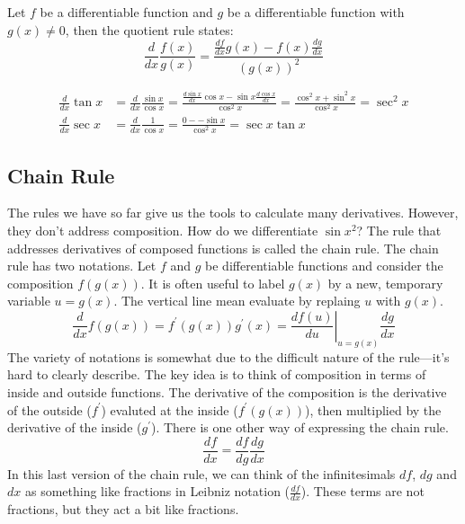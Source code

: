 \documentclass[fleqn]{report}
\begin{document}
Let $f$ be a differentiable function
and $g$ be a differentiable function with $g(x) \neq 0$, then
the quotient rule states:
\begin{equation*}
\frac{d}{dx} \frac{f(x)}{g(x)} = \frac{\frac{df}{dx} g(x) - f(x)
\frac{dg}{dx}}{(g(x))^2}
\end{equation*}

\begin{example}
\begin{align*}
\frac{d}{dx} \tan x & = \frac{d}{dx} \frac{\sin x}{\cos x} =
\frac{\frac{d \sin x}{dx} \cos x - \sin x \frac{d \cos
x}{dx}}{\cos^2 x} = \frac{\cos^2 x + \sin^2 x}{\cos^2 x} =
\sec^2 x \\
\frac{d}{dx} \sec x & = \frac{d}{dx} \frac{1}{\cos x} = \frac{0 -
- \sin x}{\cos^2 x} = \sec x \tan x 
\end{align*}
\end{example}

\subsection{Chain Rule}
\label{chain-rule}

The rules we have so far give us the tools to calculate many
derivatives. However, they don't address composition. 
How do we differentiate $\sin x^2$? The rule that
addresses derivatives of composed functions is called the chain
rule. The chain rule has two notations.  Let $f$ and $g$ be
differentiable functions and consider the composition
$f(g(x))$. It is often useful to label $g(x)$ by a new,
temporary variable $u = g(x)$. The vertical line mean evaluate
by replaing $u$ with $g(x)$.
\begin{equation*}
\frac{d}{dx} f(g(x)) = f^\prime(g(x)) g^\prime(x) = \left.
\frac{df(u)}{du} \right|_{u=g(x)} \frac{dg}{dx} 
\end{equation*}
The variety of notations is somewhat due to the difficult
nature of the rule---it's hard to clearly describe. The key
idea is to think of composition in terms of inside and outside
functions. The derivative of the composition is the derivative of the
outside ($f^\prime$) evaluted at the inside ($f^\prime(g(x))$),
then multiplied by the derivative of the inside ($g^\prime$).
There is one other way of expressing the chain rule.
\begin{equation*}
\frac{df}{dx} = \frac{df}{dg} \frac{dg}{dx}
\end{equation*}
In this last version of the chain rule, we can think of the
infinitesimals $df$, $dg$ and $dx$ as something like fractions
in Leibniz notation ($\frac{df}{dx}$). These terms are not
fractions, but they act a bit like fractions.
\end{document}
